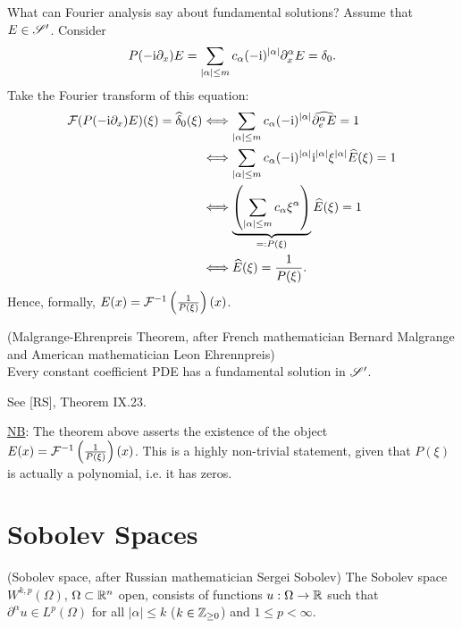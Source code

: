\documentclass[11pt]{article}
\begin{document}
			What can Fourier analysis say about fundamental solutions? Assume that $E\in\mathscr{S}^\prime$. Consider
			\begin{equation*}
				P(-\mathrm{i}\partial_x)E=\sum_{|\alpha|\le m}c_\alpha(-\mathrm{i})^{|\alpha|}\partial^\alpha_xE=\delta_0.
			\end{equation*}
			Take the Fourier transform of this equation:
			\begin{align*}
				\mathcal{F}(P(-\mathrm{i}\partial_x)E)(\xi)=\widehat{\delta}_0(\xi)&\Longleftrightarrow\sum_{|\alpha|\le m}c_\alpha(-\mathrm{i})^{|\alpha|}\widehat{\partial^\alpha_eE}=1\\&\Longleftrightarrow\sum_{|\alpha|\le m}c_\alpha(-\mathrm{i})^{|\alpha|}\mathrm{i}^{|\alpha|}\xi^{|\alpha|}\widehat{E}(\xi)=1\\&\Longleftrightarrow\underbrace{\left(\sum_{|\alpha|\le m}c_\alpha\xi^\alpha\right)}_{=:P(\xi)}\widehat{E}(\xi)=1\\&\Longleftrightarrow\widehat{E}(\xi)=\frac{1}{P(\xi)}.
			\end{align*}
			Hence, formally, $E(x)=\mathcal{F}^{-1}\left(\frac{1}{P(\xi)}\right)(x)$.

			\begin{thm}
				(Malgrange-Ehrenpreis Theorem, after French mathematician Bernard Malgrange and American mathematician Leon Ehrennpreis)\\
				Every constant coefficient PDE has a fundamental solution in $\mathscr{S}^\prime$.
			\end{thm}
			\begin{pproof}
				See [RS], Theorem IX.23.
			\end{pproof}

			\noindent\underline{NB}: The theorem above asserts the existence of the object $E(x)=\mathcal{F}^{-1}\left(\frac{1}{P(\xi)}\right)(x)$. This is a highly non-trivial statement, given that $P(\xi)$ is actually a polynomial, i.e. it has zeros.


		
	\section{Sobolev Spaces}

		\begin{defi}\label{def--sobolev}
			(Sobolev space, after Russian mathematician Sergei Sobolev) The Sobolev space $W^{k,p}(\Omega)$, $\Omega\subset\mathbb{R}^n$ open, consists of functions $u:\Omega\rightarrow\mathbb{R}$ such that $\partial^\alpha u\in L^p(\Omega)$ for all $|\alpha|\le k$ ($k\in\mathbb{Z}_{\ge0}$) and $1\le p<\infty$. 
		\end{defi}
\end{document}
